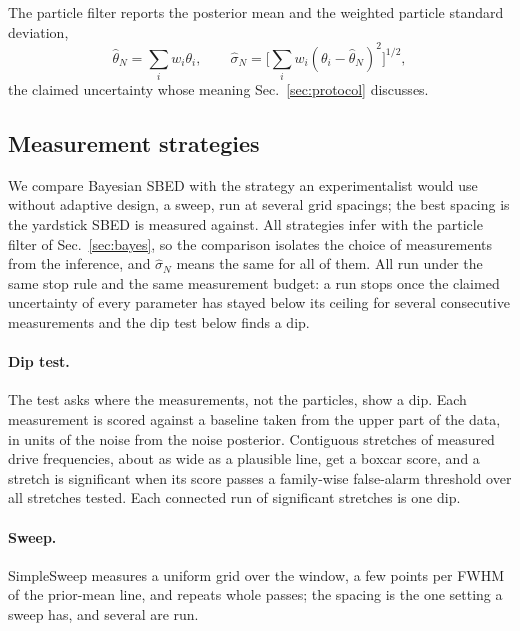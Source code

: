 The particle filter reports the posterior mean and the weighted particle standard deviation,
\begin{equation}
  \hat\theta_N=\sum_i w_i \theta_i,\qquad
  \hat\sigma_N=\Big[\sum_i w_i(\theta_i-\hat\theta_N)^2\Big]^{1/2},
  \label{eq:sigma-hat}
\end{equation}
the claimed uncertainty whose meaning Sec.~\ref{sec:protocol} discusses.

\subsection{Measurement strategies}
\label{sec:locators}

We compare Bayesian SBED with the strategy an experimentalist would use without adaptive design, a sweep, run at
several grid spacings; the best spacing is the yardstick SBED is measured against. All strategies infer with the
particle filter of Sec.~\ref{sec:bayes}, so the comparison isolates the choice of measurements from the inference,
and $\hat\sigma_N$ means the same for all of them. All run under the same stop rule and the same measurement budget:
a run stops once the claimed uncertainty of every parameter has stayed below its ceiling for several consecutive
measurements and the dip test below finds a dip.

\paragraph{Dip test.} The test asks where the measurements, not the particles, show a dip. Each measurement is scored
against a baseline taken from the upper part of the data, in units of the noise from the noise posterior. Contiguous
stretches of measured drive frequencies, about as wide as a plausible line, get a boxcar score, and a stretch is
significant when its score passes a family-wise false-alarm threshold over all stretches tested. Each connected run of
significant stretches is one dip.

\paragraph{Sweep.} SimpleSweep measures a uniform grid over the window, a few points per FWHM of the
prior-mean line, and repeats whole passes; the spacing is the one setting a sweep has, and several are run.


